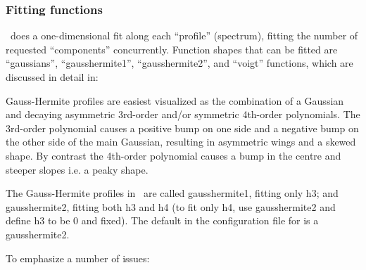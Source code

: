 \documentclass[oneside,11pt]{starlink}
\begin{document}
\subsubsection{Fitting functions}

\fitdd\ does a one-dimensional fit along each ``profile'' (spectrum),
fitting the number of requested ``components'' concurrently. Function
shapes that can be fitted are ``gaussians'', ``gausshermite1'',
``gausshermite2'', and ``voigt'' functions, which are discussed in
detail in:

\begin{terminalv}
\end{terminalv}

Gauss-Hermite profiles are easiest visualized as the combination of a
Gaussian and decaying asymmetric 3rd-order and/or symmetric 4th-order
polynomials. The 3rd-order polynomial causes a positive bump on one
side and a negative bump on the other side of the main Gaussian,
resulting in asymmetric wings and a skewed shape. By contrast the
4th-order polynomial causes a bump in the centre and steeper slopes
i.e. a peaky shape.

The Gauss-Hermite profiles in \fitdd\ are called gausshermite1,
fitting only h3; and gausshermite2, fitting both h3 and h4 (to fit
only h4, use gausshermite2 and define h3 to be 0 and fixed). The
default in the configuration file for  is a
gausshermite2.

To emphasize a number of issues:
\end{document}
